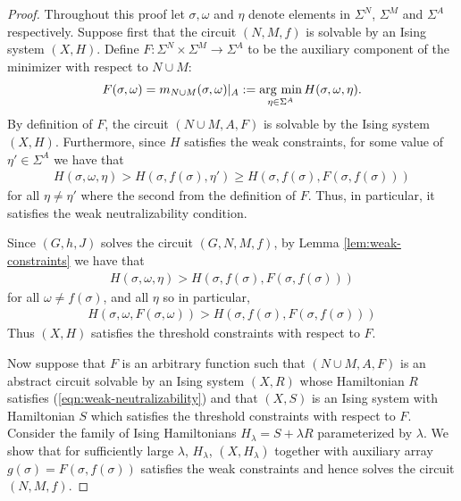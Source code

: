 \documentclass{article}
\begin{document}
\begin{proof}
  Throughout this proof let $\sigma, \omega$ and $\eta$ denote elements in $\Sigma^N$, $\Sigma^M$ and $\Sigma^A$ respectively. Suppose first that the circuit $(N, M, f)$ is solvable by an Ising system $(X, H)$. Define $F:\Sigma^N\times \Sigma^M \to \Sigma^A$ to be the auxiliary component of the minimizer with respect to $N\cup M$:
  \begin{align*}
    F(\sigma, \omega) = m_{N\cup M}(\sigma, \omega)|_A := \operatorname*{arg ~ min}_{\eta\in \Sigma^A} H(\sigma, \omega, \eta).
  \end{align*}
  By definition of $F$, the circuit $(N\cup M, A, F)$ is solvable by the Ising system $(X, H)$. Furthermore, since $H$ satisfies the weak constraints, for some value of $\eta' \in \Sigma^A$ we have that
  \begin{align*}
    H(\sigma, \omega, \eta) > H(\sigma, f(\sigma), \eta') \geq H(\sigma, f(\sigma), F(\sigma, f(\sigma)))
  \end{align*}
  for all $\eta \neq \eta'$ where the second from the definition of $F$. Thus, in particular, it satisfies the weak neutralizability condition.

  Since $(G,h,J)$ solves the circuit $(G, N, M, f)$, by Lemma \ref{lem:weak-constraints} we have that
  \begin{align*}
    H(\sigma, \omega, \eta) > H(\sigma, f(\sigma), F(\sigma, f(\sigma)))
  \end{align*}
  for all $\omega \neq f(\sigma)$, and all $\eta$ so in particular,
  \begin{align*}
    H(\sigma, \omega, F(\sigma, \omega)) > H(\sigma, f(\sigma), F(\sigma, f(\sigma)))
  \end{align*}
  Thus $(X, H)$ satisfies the threshold constraints with respect to $F$.

  \vspace{1.5em}

  Now suppose that $F$ is an arbitrary function such that $(N\cup M, A, F)$ is an abstract circuit solvable by an Ising system $(X, R)$ whose Hamiltonian $R$ satisfies (\ref{eqn:weak-neutralizability}) and that $(X,S)$ is an Ising system with Hamiltonian $S$ which satisfies the threshold constraints with respect to $F$. Consider the family of Ising Hamiltonians $H_\lambda = S + \lambda R$ parameterized by $\lambda$. We show that for sufficiently large $\lambda$, $H_\lambda$, $(X,H_\lambda)$ together with auxiliary array $g(\sigma) = F(\sigma, f(\sigma))$ satisfies the weak constraints and hence solves the circuit $(N,M,f)$.


\end{proof}
\end{document}
